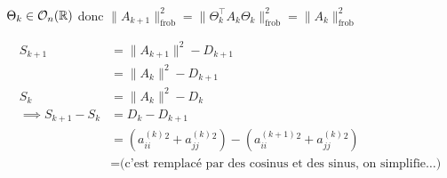 \documentclass{article}
\begin{document}
\paragraph{}

$\Theta_k \in \mathcal{O}_n(\mathbb{R})$ donc $\|A_{k+1}\|_\text{frob}^2 = \| \Theta_k^\top A_k \Theta_k \|_\text{frob}^2 = \|A_k\|_\text{frob}^2 $

\begin{align*}
	S_{k+1} &=  \|A_{k+1}\|^2 - D_{k+1} \\\
	&= \| A_k \|^2 - D_{k+1} \\
	S_k &= \|A_k\|^2 - D_k \\
	\implies S_{k+1} - S_k &= D_k - D_{k+1} \\
	&= (a_{ii}^{(k)}^2 + a_{jj}^{(k)}^2) - (a_{ii}^{(k+1)}^2 + a_{jj}^{(k)}^2) \\
	&= \text{(c'est remplacé par des cosinus et des sinus, on simplifie\ldots)} \\
\end{align*}
\end{document}
